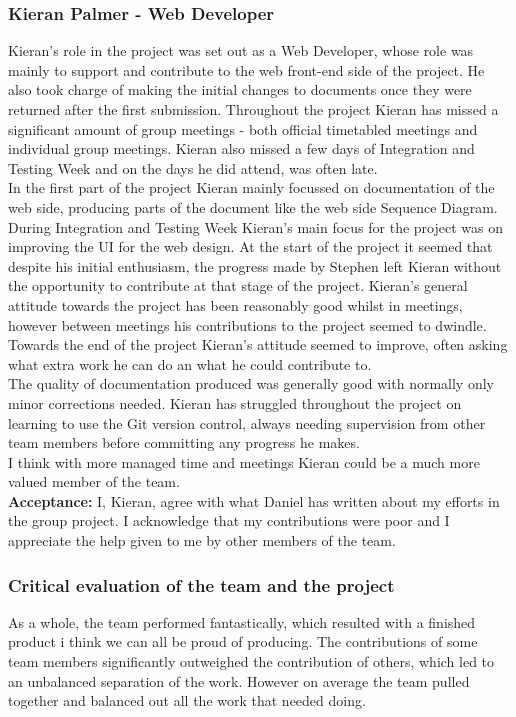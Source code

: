 \documentclass{article}
\begin{document}
		\subsubsection{Kieran Palmer - Web Developer}
		Kieran's role in the project was set out as a Web Developer, whose role was mainly to support and contribute to the web front-end side of the project. He also took charge of making the initial changes to documents once they were returned after the first submission. Throughout the project Kieran has missed a significant amount of group meetings - both official timetabled meetings and individual group meetings. Kieran also missed a few days of Integration and Testing Week and on the days he did attend, was often late. \\
		In the first part of the project Kieran mainly focussed on documentation of the web side, producing parts of the document like the web side Sequence Diagram. During Integration and Testing Week Kieran's main focus for the project was on improving the UI for the web design. At the start of the project it seemed that despite his initial enthusiasm, the progress made by Stephen left Kieran without the opportunity to contribute at that stage of the project. Kieran's general attitude towards the project has been reasonably good whilst in meetings, however between meetings his contributions to the project seemed to dwindle. Towards the end of the project Kieran's attitude seemed to improve, often asking what extra work he can do an what he could contribute to. \\
		
		The quality of documentation produced was generally good with normally only minor corrections needed.	Kieran has struggled throughout the project on learning to use the Git version control, always needing supervision from other team members before committing any progress he makes. \\
		
		I think with more managed time and meetings Kieran could be a much more valued member of the team. \\
		
{\bf Acceptance:} I, Kieran, agree with what Daniel has written about my efforts in the group project. I acknowledge that my contributions were poor and I appreciate the help given to me by other members of the team.


		\subsubsection{Critical evaluation of the team and the project}
		As a whole, the team performed fantastically, which resulted with a finished product i think we can all be proud of producing. The contributions of some team members significantly outweighed the contribution of others, which led to an unbalanced separation of the work. However on average the team pulled together and balanced out all the work that needed doing. \\
\end{document}
